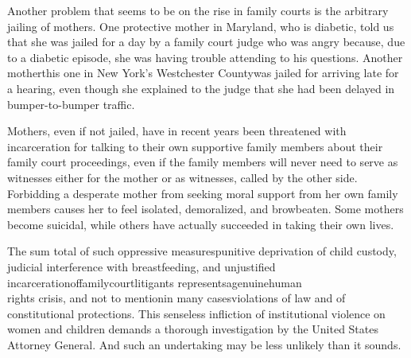 \vspace{3em}

\vspace{-5pt}
\noindent{}Another problem that seems to be on the rise in family courts is the 
arbitrary jailing of mothers. One protective mother in Maryland, who is
diabetic, told us that she was jailed for a day by a family court judge
who was angry because, due to a diabetic episode, she was having
trouble attending to his questions. Another mother\mdash{}this one in New
York's Westchester County\mdash{}was jailed for arriving late for a hearing,
even though she explained to the judge that she had been delayed in
bumper-to-bumper traffic. \pfl{}

\enlargethispage{25pt}Mothers, even if not jailed, have in recent years been threatened with
incarceration for talking to their own supportive family members about
their family court proceedings, even if the family members will never
need to serve as witnesses either for the mother or as  witnesses,
called by the other side. Forbidding a desperate mother from seeking
moral support from her own family members causes her to feel isolated,
demoralized, and browbeaten. Some mothers become suicidal, while
others have actually succeeded in taking their own lives. \pfl{}\newpage{}



\noindent{}The sum total of such oppressive measures\mdash{}punitive deprivation of
child custody, judicial interference with breastfeeding, and unjustified
incarceration\prsa{}of\prsa{}family\prsa{}court\prsa{}litigants{\prsc}\mdash{}{\prsb}%
represents\prsa{}a\prsa{}genuine\prsa{}human\\
rights crisis, and not to mention\mdash{}in many cases\mdash{}violations of law and
of constitutional protections. This senseless infliction of institutional 
violence on women and children demands a thorough investigation by the
United States Attorney General. And such an undertaking may be less
unlikely than it sounds.  \pfl{}

